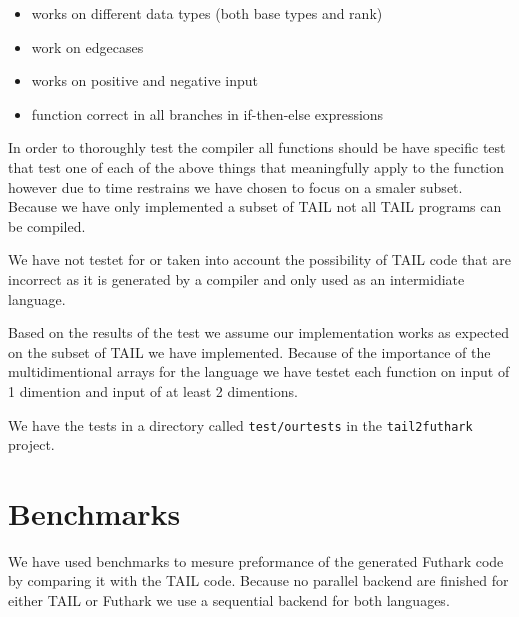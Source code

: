 \documentclass[11pt]{article}
\begin{document}
\begin{itemize}
\item works on different data types (both base types and rank)
\item work on edgecases
\item works on positive and negative input
\item function correct in all branches in if-then-else expressions
\end{itemize}
In order to thoroughly test the compiler all functions should be have specific test that test one of each of the above things
that meaningfully apply to the function however due to time restrains we have chosen to focus on a smaler subset. \\

Because we have only implemented a subset of TAIL not all TAIL programs can be compiled. 


We have not testet for or taken into account the possibility of TAIL code that are incorrect as it is generated by a compiler and only used as an intermidiate language. 

Based on the results of the test we assume our implementation works as expected on the subset of TAIL we have implemented. 
Because of the importance of the multidimentional arrays for the language we have testet each function on input of 1 dimention and input of at least 2 dimentions. 


We have the tests in a directory called {\tt test/ourtests} in the {\tt tail2futhark} project. \\



\section{Benchmarks}
\label{sec:benchmarks}
We have used benchmarks to mesure preformance of the generated Futhark code by comparing it with the TAIL code.
Because no parallel backend are finished for either TAIL or Futhark we use a sequential backend for both languages. \\
\end{document}
